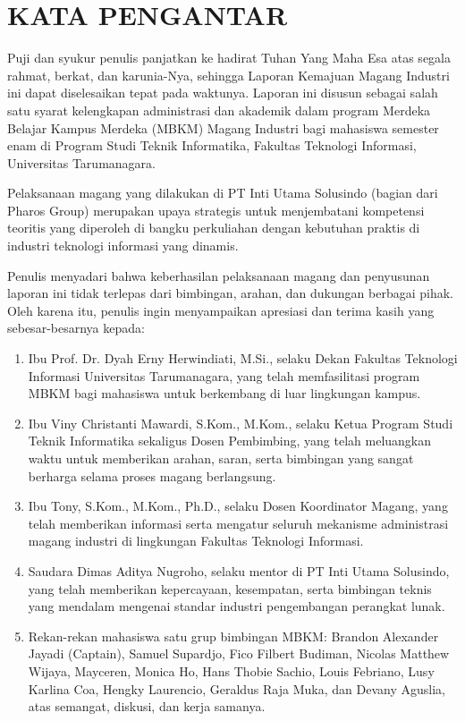 \chapter*{KATA PENGANTAR}

Puji dan syukur penulis panjatkan ke hadirat Tuhan Yang Maha Esa 
atas segala rahmat, berkat, dan karunia-Nya, sehingga Laporan Kemajuan 
Magang Industri ini dapat diselesaikan tepat pada waktunya. Laporan ini disusun sebagai salah satu syarat kelengkapan administrasi 
dan akademik dalam program Merdeka Belajar Kampus Merdeka (MBKM) 
Magang Industri bagi mahasiswa semester enam di Program Studi Teknik 
Informatika, Fakultas Teknologi Informasi, Universitas Tarumanagara. 

Pelaksanaan magang yang dilakukan di PT Inti Utama Solusindo 
(bagian dari Pharos Group) merupakan upaya strategis untuk menjembatani 
kompetensi teoritis yang diperoleh di bangku perkuliahan dengan 
kebutuhan praktis di industri teknologi informasi yang dinamis.

Penulis menyadari bahwa keberhasilan pelaksanaan magang dan 
penyusunan laporan ini tidak terlepas dari bimbingan, arahan, 
dan dukungan berbagai pihak. Oleh karena itu, penulis ingin 
menyampaikan apresiasi dan terima kasih yang sebesar-besarnya kepada:

\begin{enumerate}[label=\arabic*.,
    leftmargin=2.5em,
    labelindent=0pt,]
    \item Ibu Prof. Dr. Dyah Erny Herwindiati, M.Si., selaku Dekan Fakultas Teknologi Informasi Universitas Tarumanagara, yang telah memfasilitasi program MBKM bagi mahasiswa untuk berkembang di luar lingkungan kampus.
    \item Ibu Viny Christanti Mawardi, S.Kom., M.Kom., selaku Ketua Program Studi Teknik Informatika sekaligus Dosen Pembimbing, yang telah meluangkan waktu untuk memberikan arahan, saran, serta bimbingan yang sangat berharga selama proses magang berlangsung.
    \item Ibu Tony, S.Kom., M.Kom., Ph.D., selaku Dosen Koordinator Magang, yang telah memberikan informasi serta mengatur seluruh mekanisme administrasi magang industri di lingkungan Fakultas Teknologi Informasi.
    \item Saudara Dimas Aditya Nugroho, selaku mentor di PT Inti Utama Solusindo, yang telah memberikan kepercayaan, kesempatan, serta bimbingan teknis yang mendalam mengenai standar industri pengembangan perangkat lunak.
    \item Rekan-rekan mahasiswa satu grup bimbingan MBKM: Brandon Alexander Jayadi (Captain), Samuel Supardjo, Fico Filbert Budiman, Nicolas Matthew Wijaya, Mayceren, Monica Ho, Hans Thobie Sachio, Louis Febriano, Lusy Karlina Coa, Hengky Laurencio, Geraldus Raja Muka, dan Devany Aguslia, atas semangat, diskusi, dan kerja samanya.
\end{enumerate}

